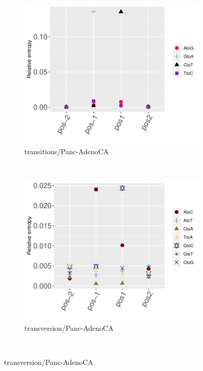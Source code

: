 \begin{figure}[ht!]
    \begin{subfigure}{.5\textwidth}
    \includegraphics[scale=0.63]{graphics/nbr_transitions_Panc-AdenoCA.pdf}
    \caption{transitions/Panc-AdenoCA}
    \label{fig:transitions_panc-adenoca}
    \end{subfigure}
    ~
    \begin{subfigure}{.5\textwidth}
    \includegraphics[scale=0.63]{graphics/nbr_transversion_Panc-AdenoCA.pdf}
    \caption{transversion/Panc-AdenoCA}
    \label{fig:transversion_panc-adenoca}
    \end{subfigure} \\
    

\end{figure}
